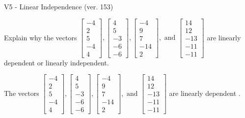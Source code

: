 \begin{exercise}
  \begin{exerciseTitle}V5 - Linear Independence (ver. 153)\end{exerciseTitle}
  \begin{exerciseStatement}
    Explain why the vectors \(\left[\begin{array}{r}
-4 \\
2 \\
5 \\
-4 \\
4
\end{array}\right] , \left[\begin{array}{r}
4 \\
5 \\
-3 \\
-6 \\
-6
\end{array}\right] , \left[\begin{array}{r}
-4 \\
9 \\
7 \\
-14 \\
2
\end{array}\right] , \text{ and } \left[\begin{array}{r}
14 \\
12 \\
-13 \\
-11 \\
-11
\end{array}\right]\) are linearly dependent or linearly independent.	


  \end{exerciseStatement}
  \begin{exerciseAnswer}
   The vectors \(\left[\begin{array}{r}
-4 \\
2 \\
5 \\
-4 \\
4
\end{array}\right] , \left[\begin{array}{r}
4 \\
5 \\
-3 \\
-6 \\
-6
\end{array}\right] , \left[\begin{array}{r}
-4 \\
9 \\
7 \\
-14 \\
2
\end{array}\right] , \text{ and } \left[\begin{array}{r}
14 \\
12 \\
-13 \\
-11 \\
-11
\end{array}\right]\) are 
  	 linearly dependent  .
  


  \end{exerciseAnswer}
\end{exercise}